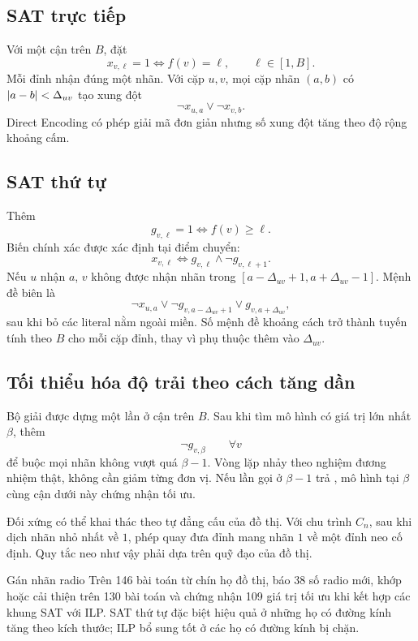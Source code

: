 \subsection{SAT trực tiếp}

Với một cận trên \(B\), đặt
\[
  x_{v,\ell}=1\iff f(v)=\ell,
  \qquad \ell\in[1,B].
\]
Mỗi đỉnh nhận đúng một nhãn. Với cặp \(u,v\), mọi cặp nhãn
\((a,b)\) có \(\lvert a-b\rvert<\Delta_{uv}\) tạo xung đột
\[
  \neg x_{u,a}\lor\neg x_{v,b}.
\]
Direct Encoding có phép giải mã đơn giản nhưng số xung đột tăng theo độ rộng
khoảng cấm.

\subsection{SAT thứ tự}

Thêm
\[
  g_{v,\ell}=1\iff f(v)\ge\ell.
\]
Biến chính xác được xác định tại điểm chuyển:
\[
  x_{v,\ell}\iff
  g_{v,\ell}\land\neg g_{v,\ell+1}.
\]
Nếu \(u\) nhận \(a\), \(v\) không được nhận nhãn trong
\([a-\Delta_{uv}+1,a+\Delta_{uv}-1]\). Mệnh đề biên là
\[
  \neg x_{u,a}
  \lor
  \neg g_{v,a-\Delta_{uv}+1}
  \lor
  g_{v,a+\Delta_{uv}},
\]
sau khi bỏ các literal nằm ngoài miền. Số mệnh đề khoảng cách trở thành tuyến tính
theo \(B\) cho mỗi cặp đỉnh, thay vì phụ thuộc thêm vào \(\Delta_{uv}\).

\subsection{Tối thiểu hóa độ trải theo cách tăng dần}

Bộ giải được dựng một lần ở cận trên \(B\). Sau khi tìm mô hình có giá trị lớn
nhất \(\beta\), thêm
\[
  \neg g_{v,\beta}
  \qquad\forall v
\]
để buộc mọi nhãn không vượt quá \(\beta-1\). Vòng lặp nhảy theo nghiệm đương
nhiệm thật, không cần giảm từng đơn vị. Nếu lần gọi ở \(\beta-1\) trả \UNSAT,
mô hình tại \(\beta\) cùng cận dưới này chứng nhận tối ưu.

Đối xứng có thể khai thác theo tự đẳng cấu của đồ thị. Với chu trình \(C_n\),
sau khi dịch nhãn nhỏ nhất về \(1\), phép quay đưa đỉnh mang nhãn \(1\) về một
đỉnh neo cố định. Quy tắc neo như vậy phải dựa trên quỹ đạo của đồ thị.

\begin{resultbox}{Gán nhãn radio}
Trên 146 bài toán từ chín họ đồ thị, \textcite{thanh2026radio} báo 38 số radio
mới, khớp hoặc cải thiện \BKS trên 130 bài toán và chứng nhận 109 giá trị tối
ưu khi kết hợp các khung SAT với ILP. SAT thứ tự đặc biệt hiệu quả ở những họ
có đường kính tăng theo kích thước; ILP bổ sung tốt ở các họ có đường kính bị
chặn.
\end{resultbox}

